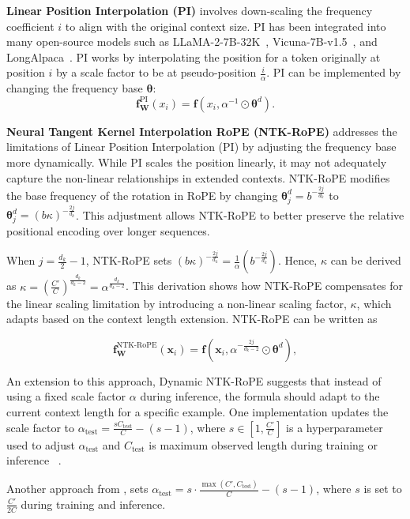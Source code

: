\documentclass{article}
\begin{document}
\textbf{Linear Position Interpolation (PI)} involves down-scaling the frequency coefficient $i$ to align with the original context size. PI has been integrated into many open-source models such as LLaMA-2-7B-32K~\citep{together-instruct}, Vicuna-7B-v1.5~\citep{vicuna2023}, and LongAlpaca~\citep{chen2023longlora}. PI works by interpolating the position for a token originally at position $i$ by a scale factor to be at pseudo-position $\frac{i}{\alpha}$.
 PI can be implemented by changing the frequency base $\bm{\theta}$:
\begin{equation}
\mathbf{f}_\mathbf{W}^{\text{PI}}(x_i) = \mathbf{f}(x_i, \alpha^{-1} \odot \bm{\theta}^d).
\end{equation}


\textbf{Neural Tangent Kernel Interpolation RoPE (NTK-RoPE) } addresses the limitations of Linear Position Interpolation (PI) by adjusting the frequency base more dynamically. While PI scales the position linearly, it may not adequately capture the non-linear relationships in extended contexts. NTK-RoPE modifies the base frequency of the rotation in RoPE by changing $\bm{\theta}^d_j = b^{-\frac{2j}{d_k}}$ to $\bm{\theta}^d_j = (b\kappa)^{-\frac{2j}{d_k}}$. This adjustment allows NTK-RoPE to better preserve the relative positional encoding over longer sequences.

When $j= \frac{d_k}{2}-1$, NTK-RoPE sets  $(b\kappa)^{-\frac{2j}{d_k}} = \frac{1}{\alpha} (b^{-\frac{2j}{d_k}})$. Hence, $\kappa$ can be derived as  $\kappa = (\frac{C'}{C})^{\frac{d_k}{d_k-2}} = \alpha^{\frac{d_k}{d_k-2}}$. This derivation shows how NTK-RoPE compensates for the linear scaling limitation by introducing a non-linear scaling factor, $\kappa$, which adapts based on the context length extension. NTK-RoPE can be written as 

\begin{equation}
 \mathbf{f}_\mathbf{W}^{\text{NTK-RoPE}}(\mathbf{x}_i) = \mathbf{f}(\mathbf{x}_i,   \alpha^{-\frac{2j}{d_k-2}} \odot \bm{\theta}^d),
\end{equation}

An extension to this approach, Dynamic NTK-RoPE suggests that instead of using a fixed scale factor $\alpha$ during inference, the formula should adapt to the current context length for a specific example. One implementation updates the scale factor to $\alpha_{\text{test}} = \frac{s C_\text{test}}{C} - (s - 1)$, where $s \in [1, \frac{C'}{C}]$ is a hyperparameter used to adjust $\alpha_{\text{test}}$ and $C_\text{test}$ is maximum observed length during training or inference ~\citep{fu2024data}.

Another approach from \citep{fu2024data}, sets $\alpha_{\text{test}} = s \cdot \frac{\max(C', C_\text{test})}{C}-(s-1)$, where $s$ is set to $\frac{C'}{2C}$ during training and inference.



\end{document}
